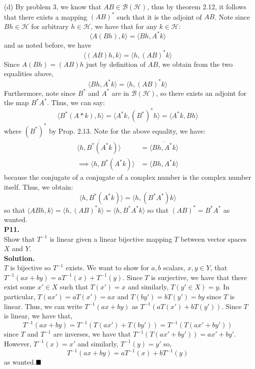 \documentclass{article}
\begin{document}
     (d) By problem 3, we know that $AB\in\mathcal{B}(\mathcal{H})$, thus by theorem 2.12, it follows that there exists a mapping
     $(AB)^*$ such that it is the adjoint of $AB$. Note since $Bh\in\mathcal{H}$ for arbitrary $h\in\mathcal{H}$, we have that
     for any $k\in\mathcal{H}$:
     \[ \langle A(Bh),k\rangle = \langle Bh,A^*k\rangle \]
     and as noted before, we have
     \[ \langle (AB)h,k\rangle = \langle h,(AB)^*k\rangle \]
     Since $A(Bh) = (AB)h$ just by definition of $AB$, we obtain from the two equalities above,
     \[ \langle Bh, A^* k\rangle = \langle h,(AB)^*k\rangle \]
     Furthermore, note since $B^*$ and $A^*$ are in $\mathcal{B}(\mathcal{H})$, so there exists an adjoint for the map
     $B^* A^*$. Thus, we can say:
     \[ \langle B^*(A* k),h\rangle = \langle A^* k, (B^*)^* h\rangle = \langle A^*k,Bh\rangle \]
     where $(B^*)^*$ by Prop. 2.13. Note for the above equality, we have:
     \begin{align*}
         \overline{\langle h, B^*(A^* k)\rangle} &= \overline{\langle Bh, A^*k\rangle} \\
         \implies \langle h,B^*(A^*k)\rangle &= \langle Bh,A^*k\rangle
     \end{align*}
     because the conjugate of a conjugate of a complex number is the complex number itself. Thus, we obtain:
     \[ \langle h,B^*(A^*k)\rangle = \langle h,(B^*A^*)k\rangle \]
     so that $\langle ABh,k\rangle = \langle h,(AB)^*k\rangle = \langle h,B^*A^*k\rangle$ so that $(AB)^* = B^* A^*$ as wanted.\\

     \textbf{P11.}\\

     Show that $T^{-1}$ is linear given a linear bijective mapping $T$ between vector spaces $X$ and $Y$.\\

     \textbf{Solution.}\\

     $T$ is bijective so $T^{-1}$ exists. We want to show for $a,b$ scalars, $x,y\in Y$, that $T^{-1}(ax+by) = aT^{-1}(x)+T^{-1}(y)$.
     Since $T$ is surjective, we have that there exist some $x'\in X$ such that $T(x') = x$ and similarly,
     $T(y'\in X) = y$. In particular, $T(ax') = aT(x') = ax$ and $T(by') = bT(y') = by$ since $T$ is linear. Thus, we can
     write $T^{-1}(ax+by)$ as $T^{-1}(aT(x') + bT(y'))$. Since $T$ is linear, we have that,
     \[ T^{-1}(ax+by) = T^{-1}(T(ax') + T(by')) = T^{-1}(T(ax'+by')) \]
     since $T$ and $T^{-1}$ are inverses, we have that $T^{-1}(T(ax'+by')) = ax' + by'$. However, $T^{-1}(x) = x'$ and similarly,
     $T^{-1}(y) = y'$ so,
     \[ T^{-1}(ax+by) = aT^{-1}(x) + bT^{-1}(y) \]
     as wanted.$\hfill\blacksquare$
\end{document}
